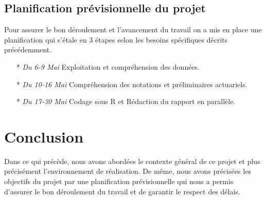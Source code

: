 \subsection{Planification prévisionnelle du projet}
Pour assurer le bon déroulement et l'avancement du travail on a mis en place une planification qui s'étale en 3 étapes selon les besoins spécifiques décrits précédemment.
\begin{itemize}
\item[*] \textit{Du 6-9 Mai } Exploitation et compréhension des données. 
    \item[*] \textit{Du 10-16 Mai} Compréhension des notations et préliminaires actuariels.
    \item[*] \textit{Du 17-30 Mai } Codage sous R et Rédaction du rapport en parallèle.
    
\end{itemize}
\section*{Conclusion}
Dans ce qui précède, nous avons abordées le contexte général de ce projet et plus
précisément l’environnement de réalisation. De même, nous avons précisées les objectifs du projet par une planification prévisionnelle qui nous a permis d’assurer le bon déroulement du travail et de garantir le respect des délais.

